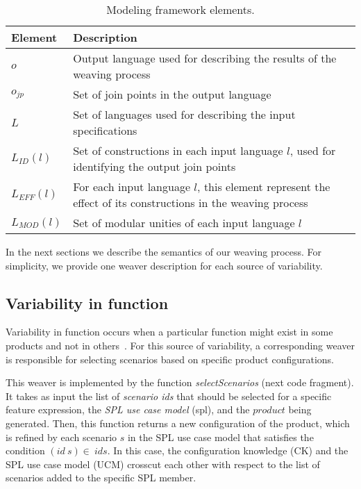 \begin{table}[h]
\begin{center}
\caption{Modeling framework elements.} \label{tab:tup-01}
\begin{tabular}{||p{0.6in}||p{2.4in}||}
  \hline
  {\bf Element} & {\bf Description} \\
   \hline
  $o$              & Output language used for describing the results of the weaving process \\ \hline
  $o_{jp}$       & Set of join points in the output language \\ \hline
  $L$              & Set of languages used for describing the input specifications \\ \hline
  $L_{ID}(l)$      & Set of constructions in each input language $l$, used for identifying the output join points \\ \hline
  $L_{EFF}(l)$   & For each input language $l$, this element represent the effect of its constructions in the weaving process \\ \hline
  $L_{MOD}(l)$  & Set of modular unities of each input language $l$\\
  \hline
\end{tabular}
\end{center}
\end{table}

In the next sections we describe the semantics of
our weaving process. For simplicity, we provide one weaver
description for each source of variability.

\subsection{Variability in function}\label{sub:pd-weaver}

Variability in function occurs when a particular function might exist in some
products and not in others~\cite{Bachmann:2001aa}. For this source of
variability, a corresponding weaver is responsible for selecting scenarios based
on specific product configurations.

This weaver is implemented by the function \emph{selectScenarios}
(next code fragment). It takes as input the list of \emph{scenario
ids} that should be selected for a specific feature expression,  the \emph{SPL
use case model} (spl), and the $product$ being generated. Then, this function
returns a new configuration of the product, which is refined by each scenario $s$
in the SPL use case model that satisfies the condition $(id\ s) \in\ ids$. In
this case, the configuration knowledge (CK) and the SPL use case model
(UCM) crosscut each other with respect to the list of scenarios added to the
specific SPL member.

